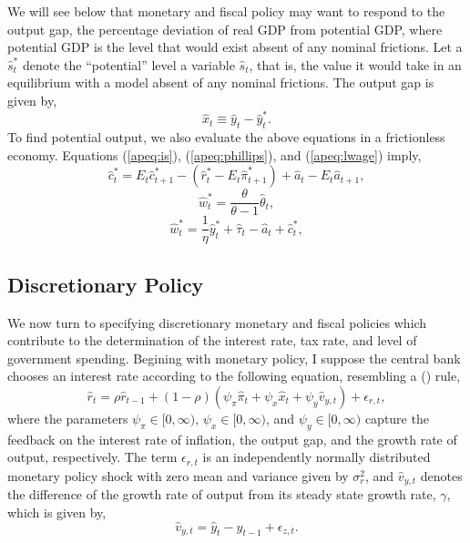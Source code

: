 \documentclass[12pt]{article}
\newcommand{\beq}{\begin{equation}}
\newcommand{\eeq}{\end{equation}}
\newcommand{\citee}[1]{\citename{#1} (\citeyear{#1})}
\begin{document}
We will see below that monetary and fiscal policy may want to respond to the output gap, the percentage deviation of real GDP from potential GDP, where potential GDP is the level that would exist absent of any nominal frictions.  Let a $\hat{s}_t^*$ denote the ``potential'' level a variable $\hat{s}_t$, that is, the value it would take in an equilibrium with a model absent of any nominal frictions.  The output gap is given by,
\beq \label{apeq:gap} \hat{x}_t \equiv \hat{y}_t - \hat{y}_t^*. \eeq
To find potential output, we also evaluate the above equations in a frictionless economy.  Equations (\ref{apeq:is}), (\ref{apeq:phillips}), and (\ref{apeq:lwage}) imply,
\beq \label{apeq:isp} \hat{c}_t^* = E_t \hat{c}_{t+1}^* - (\hat{r}_t^* - E_t \hat{\pi}^*_{t+1}) + \hat{a}_t - E_t \hat{a}_{t+1}, \eeq
\beq \label{apeq:phillipsp} \hat{w}_t^* = \frac{\theta}{\theta-1} \hat{\theta}_t, \eeq
\beq \label{apeq:lwagep} \hat{w}^*_t = \frac{1}{\eta} \hat{y}^*_t + \hat{\tau}_t - \hat{a}_t + \hat{c}^*_t, \eeq

\subsection{Discretionary Policy}

We now turn to specifying discretionary monetary and fiscal policies which contribute to the determination of the interest rate, tax rate, and level of government spending.  Begining with monetary policy, I suppose the central bank chooses an interest rate according to the following equation, resembling a \citee{taylor1993} rule,
\beq \hat{r}_t = \rho \hat{r}_{t-1} + (1-\rho) (\psi_{\pi} \hat{\pi}_t + \psi_{x} \hat{x}_t + \psi_y \hat{v}_{y,t}) + \epsilon_{r,t}, \eeq
where the parameters $\psi_{\pi} \in [0,\infty)$, $\psi_x\in [0,\infty)$, and $\psi_y \in [0,\infty)$ capture the feedback on the interest rate of inflation, the output gap, and the growth rate of output, respectively.  The term $\epsilon_{r,t}$ is an independently normally distributed monetary policy shock with zero mean and variance given by $\sigma_r^2$, and $\hat{v}_{y,t}$ denotes the difference of the growth rate of output from its steady state growth rate, $\gamma$, which is given by,
\beq \hat{v}_{y,t} = \hat{y}_t - \hat{y}_{t-1} + \epsilon_{z,t}. \eeq
\end{document}
